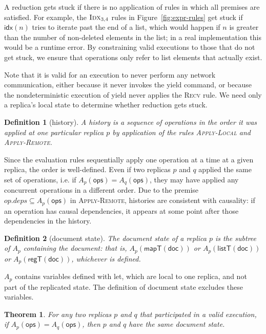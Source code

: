\documentclass[10pt,journal,compsoc]{IEEEtran}
\newtheorem{definition}{Definition}
\newtheorem*{convergence-thm}{Theorem}
\begin{document}
A reduction gets stuck if there is no application of rules in which all premises are satisfied. For example, the $\textsc{Idx}_{3,4}$ rules in Figure~\ref{fig:expr-rules} get stuck if $\mathsf{idx}(n)$ tries to iterate past the end of a list, which would happen if $n$ is greater than the number of non-deleted elements in the list; in a real implementation this would be a runtime error. By constraining valid executions to those that do not get stuck, we ensure that operations only refer to list elements that actually exist.

Note that it is valid for an execution to never perform any network communication, either because it never invokes the \textsf{yield} command, or because the nondeterministic execution of \textsf{yield} never applies the \textsc{Recv} rule. We need only a replica's local state to determine whether reduction gets stuck.

\begin{definition}[history]\label{def:history}
A \emph{history} is a sequence of operations in the order it was applied at one particular replica $p$ by application of the rules \textsc{Apply-Local} and \textsc{Apply-Remote}.
\end{definition}

Since the evaluation rules sequentially apply one operation at a time at a given replica, the order is well-defined. Even if two replicas $p$ and $q$ applied the same set of operations, i.e. if $A_p(\mathsf{ops}) = A_q(\mathsf{ops})$, they may have applied any concurrent operations in a different order. Due to the premise $\mathit{op.deps} \subseteq A_p(\mathsf{ops})$ in \textsc{Apply-Remote}, histories are consistent with causality: if an operation has causal dependencies, it appears at some point after those dependencies in the history.

\begin{definition}[document state]\label{def:doc-state}
The \emph{document state} of a replica $p$ is the subtree of $A_p$ containing the document: that is, $A_p(\mathsf{mapT}(\mathsf{doc}))$ or $A_p(\mathsf{listT}(\mathsf{doc}))$ or $A_p(\mathsf{regT}(\mathsf{doc}))$, whichever is defined.
\end{definition}

$A_p$ contains variables defined with \textsf{let}, which are local to one replica, and not part of the replicated state. The definition of document state excludes these variables.

\begin{convergence-thm}
For any two replicas $p$ and $q$ that participated in a valid execution, if $A_p(\mathsf{ops}) = A_q(\mathsf{ops})$, then $p$ and $q$ have the same document state.
\end{convergence-thm}
\end{document}
